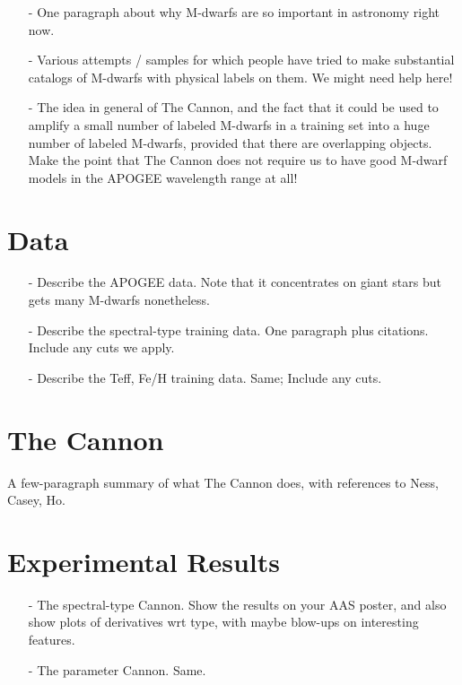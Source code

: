 \documentclass[onecolumn]{aastex62}
\begin{document}
\begin{enumerate}
\item[-] One paragraph about why M-dwarfs are so important in astronomy right now.

\item[-] Various attempts / samples for which people have tried to make substantial catalogs of M-dwarfs with physical labels on them. We might need help here!

\item[-] The idea in general of The Cannon, and the fact that it could be used to amplify a small number of labeled M-dwarfs in a training set into a huge number of labeled M-dwarfs, provided that there are overlapping objects. Make the point that The Cannon does not require us to have good M-dwarf models in the APOGEE wavelength range at all!
\end{enumerate}

\section{Data} \label{sec:data}

\begin{enumerate}
\item[-] Describe the APOGEE data. Note that it concentrates on giant stars but gets many M-dwarfs nonetheless.

\item[-] Describe the spectral-type training data. One paragraph plus citations. Include any cuts we apply.

\item[-] Describe the Teff, Fe/H training data. Same; Include any cuts.
\end{enumerate}

\section{The Cannon} \label{sec:cannon}
A few-paragraph summary of what The Cannon does, with references to Ness, Casey, Ho.


\section{Experimental Results} \label{sec:results}
\begin{enumerate}
\item[-] The spectral-type Cannon. Show the results on your AAS poster, and also show plots of derivatives wrt type, with maybe blow-ups on interesting features.

\item[-] The parameter Cannon. Same.
\end{enumerate}
\end{document}
